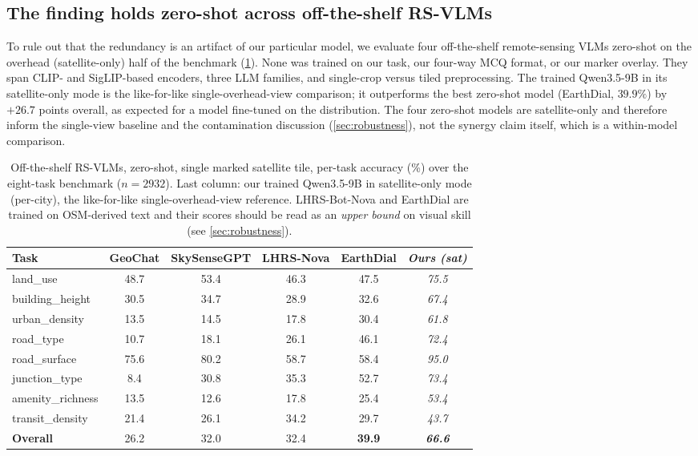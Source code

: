 \documentclass[runningheads]{llncs}
\begin{document}
\subsection{The finding holds zero-shot across off-the-shelf RS-VLMs}
\label{sec:zeroshot}

To rule out that the redundancy is an artifact of our particular model, we
evaluate four off-the-shelf remote-sensing VLMs zero-shot on the overhead
(satellite-only) half of the benchmark (\cref{tab:zeroshot}). None was trained on
our task, our four-way MCQ format, or our marker overlay. They span CLIP- and
SigLIP-based encoders, three LLM families, and single-crop versus tiled
preprocessing. The trained Qwen3.5-9B in its satellite-only mode is the
like-for-like single-overhead-view comparison; it outperforms the best zero-shot
model (EarthDial, $\num{39.9}\%$) by $+\num{26.7}$ points overall, as expected
for a model fine-tuned on the distribution. The four zero-shot models are
satellite-only and therefore inform the single-view baseline and the
contamination discussion (\cref{sec:robustness}), not the synergy claim itself,
which is a within-model comparison.

\begin{table}[t]
  \centering
  \caption{Off-the-shelf RS-VLMs, zero-shot, single marked satellite tile,
  per-task accuracy (\%) over the eight-task benchmark ($n=\num{2932}$). Last
  column: our trained Qwen3.5-9B in satellite-only mode (per-city), the
  like-for-like single-overhead-view reference. LHRS-Bot-Nova and EarthDial are
  trained on OSM-derived text and their scores should be read as an
  \emph{upper bound} on visual skill (see \cref{sec:robustness}).}
  \label{tab:zeroshot}
  \setlength{\tabcolsep}{4pt}
  \begin{tabular}{@{}lccccc@{}}
    \toprule
    Task & GeoChat & SkySenseGPT & LHRS-Nova & EarthDial & \textit{Ours (sat)} \\
    \midrule
    land\_use         & 48.7 & 53.4 & 46.3 & 47.5 & \textit{75.5} \\
    building\_height  & 30.5 & 34.7 & 28.9 & 32.6 & \textit{67.4} \\
    urban\_density    & 13.5 & 14.5 & 17.8 & 30.4 & \textit{61.8} \\
    road\_type        & 10.7 & 18.1 & 26.1 & 46.1 & \textit{72.4} \\
    road\_surface     & 75.6 & 80.2 & 58.7 & 58.4 & \textit{95.0} \\
    junction\_type    &  8.4 & 30.8 & 35.3 & 52.7 & \textit{73.4} \\
    amenity\_richness & 13.5 & 12.6 & 17.8 & 25.4 & \textit{53.4} \\
    transit\_density  & 21.4 & 26.1 & 34.2 & 29.7 & \textit{43.7} \\
    \midrule
    \textbf{Overall}  & 26.2 & 32.0 & 32.4 & \textbf{39.9} & \textit{\textbf{66.6}} \\
    \bottomrule
  \end{tabular}
\end{table}
\end{document}
